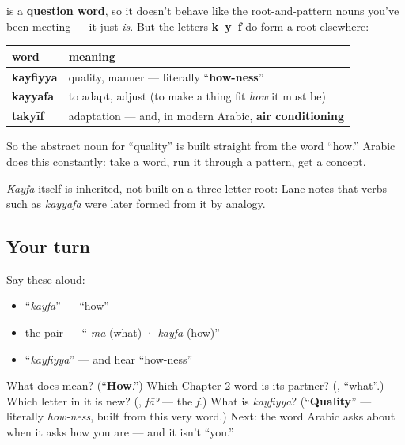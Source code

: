 \begin{cousinweb}
\textbf{} is a \textbf{question word}, so it doesn't behave like the root-and-pattern nouns you've been meeting — it just \emph{is}. But the letters \textbf{k–y–f} do form a root elsewhere:

\noindent
\begin{tabularx}{\linewidth}{@{}>{\raggedright\arraybackslash}X>{\raggedright\arraybackslash}X@{}}
\toprule
\textbf{word} & \textbf{meaning} \\
\midrule
\textbf{kayfiyya} & quality, manner — literally \textquotedblleft{}\textbf{how-ness}\textquotedblright{} \\
\textbf{kayyafa} & to adapt, adjust (to make a thing fit \emph{how} it must be) \\
\textbf{takyīf} & adaptation — and, in modern Arabic, \textbf{air conditioning} \\
\bottomrule
\end{tabularx}

So the abstract noun for \textquotedblleft{}quality\textquotedblright{} is built straight from the word \textquotedblleft{}how.\textquotedblright{} Arabic does this constantly: take a word, run it through a pattern, get a concept.

\emph{Kayfa} itself is inherited, not built on a three-letter root: Lane notes that verbs such as \emph{kayyafa} were later formed from it by analogy.
\end{cousinweb}

\subsection*{Your turn}
Say these aloud:

\begin{itemize}
\raggedright
  \item \textquotedblleft{}\emph{kayfa}\textquotedblright{} — \textquotedblleft{}how\textquotedblright{}
  \item the pair — \textquotedblleft{}\textbf{} \emph{mā} (what) · \textbf{} \emph{kayfa} (how)\textquotedblright{}
  \item \textquotedblleft{}\emph{kayfiyya}\textquotedblright{} — and hear \textquotedblleft{}how-ness\textquotedblright{}
\end{itemize}

\begin{tcolorbox}[breakable,colback=teal!4,colframe=teal!35!black,title={Before you move on}]
What does \textbf{} mean? (\textquotedblleft{}\textbf{How}.\textquotedblright{}) Which Chapter 2 word is its partner? (\textbf{}, \textquotedblleft{}what\textquotedblright{}.) Which letter in it is new? (\textbf{}, \emph{fāʾ} — the \emph{f}.) What is \emph{kayfiyya}? (\textquotedblleft{}\textbf{Quality}\textquotedblright{} — literally \emph{how-ness}, built from this very word.) Next: the word Arabic asks about when it asks how you are — and it isn't \textquotedblleft{}you.\textquotedblright{}
\end{tcolorbox}
